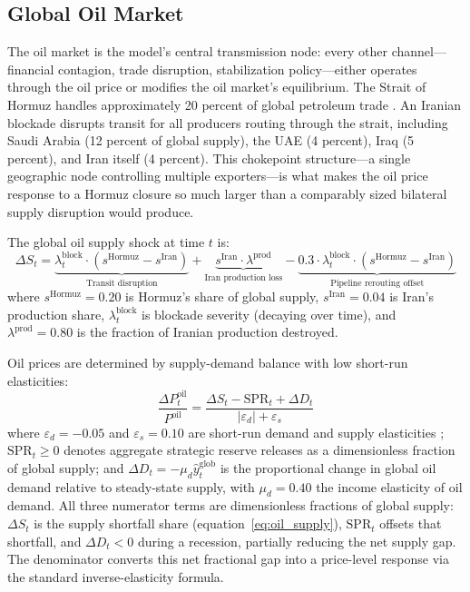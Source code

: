\documentclass[12pt]{article}
\begin{document}
\subsection{Global Oil Market}

The oil market is the model's central transmission node: every other channel---financial contagion, trade disruption, stabilization policy---either operates through the oil price or modifies the oil market's equilibrium. The Strait of Hormuz handles approximately 20 percent of global petroleum trade \citep{eia2023hormuz}. An Iranian blockade disrupts transit for all producers routing through the strait, including Saudi Arabia (12 percent of global supply), the UAE (4 percent), Iraq (5 percent), and Iran itself (4 percent). This chokepoint structure---a single geographic node controlling multiple exporters---is what makes the oil price response to a Hormuz closure so much larger than a comparably sized bilateral supply disruption would produce.

The global oil supply shock at time $t$ is:
\begin{equation}
\Delta S_t = \underbrace{\lambda^{\text{block}}_t \cdot (s^{\text{Hormuz}} - s^{\text{Iran}})}_{\text{Transit disruption}} + \underbrace{s^{\text{Iran}} \cdot \lambda^{\text{prod}}}_{\text{Iran production loss}} - \underbrace{0.3 \cdot \lambda^{\text{block}}_t \cdot (s^{\text{Hormuz}} - s^{\text{Iran}})}_{\text{Pipeline rerouting offset}}
\label{eq:oil_supply}
\end{equation}
where $s^{\text{Hormuz}} = 0.20$ is Hormuz's share of global supply, $s^{\text{Iran}} = 0.04$ is Iran's production share, $\lambda^{\text{block}}_t$ is blockade severity (decaying over time), and $\lambda^{\text{prod}} = 0.80$ is the fraction of Iranian production destroyed.

Oil prices are determined by supply-demand balance with low short-run elasticities:
\begin{equation}
\frac{\Delta P^{\text{oil}}_t}{P^{\text{oil}}} = \frac{\Delta S_t - \text{SPR}_t + \Delta D_t}{|\varepsilon_d| + \varepsilon_s}
\label{eq:oil_price}
\end{equation}
where $\varepsilon_d = -0.05$ and $\varepsilon_s = 0.10$ are short-run demand and supply elasticities \citep{hamilton2009understanding}; $\text{SPR}_t \geq 0$ denotes aggregate strategic reserve releases as a dimensionless fraction of global supply; and $\Delta D_t = -\mu_d \hat{y}^{\text{glob}}_t$ is the proportional change in global oil demand relative to steady-state supply, with $\mu_d = 0.40$ the income elasticity of oil demand. All three numerator terms are dimensionless fractions of global supply: $\Delta S_t$ is the supply shortfall share (equation~\ref{eq:oil_supply}), $\text{SPR}_t$ offsets that shortfall, and $\Delta D_t < 0$ during a recession, partially reducing the net supply gap. The denominator converts this net fractional gap into a price-level response via the standard inverse-elasticity formula.
\end{document}
